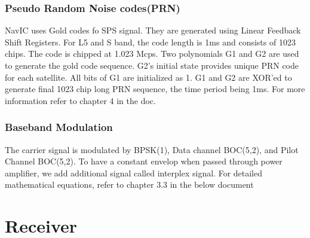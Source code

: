 \documentclass[11pt]{book}
\begin{document}
\subsection{Pseudo Random Noise codes(PRN)}
NavIC uses Gold codes fo SPS signal. They are generated using Linear Feedback Shift Registers. For L5 and S band, the code length is 1ms and consists of 1023 chips. The code is chipped at 1.023 Mcps. Two polynomials G1 and G2 are used to generate the gold code sequence. G2's initial state provides unique PRN code for each satellite. All bits of G1 are initialized as 1. G1 and G2 are XOR'ed to generate final 1023 chip long PRN sequence, the time period being 1ms. For more information refer to chapter 4 in the doc.
\subsection{Baseband Modulation}
The carrier signal is modulated by BPSK(1), Data channel BOC(5,2), and Pilot Channel BOC(5,2). To have a constant envelop when passed through power amplifier, we add additional signal called interplex signal.
For detailed mathematical equations, refer to chapter 3.3 in the below document
%

\latexprintindex
\chapter{Receiver}
\end{document}
